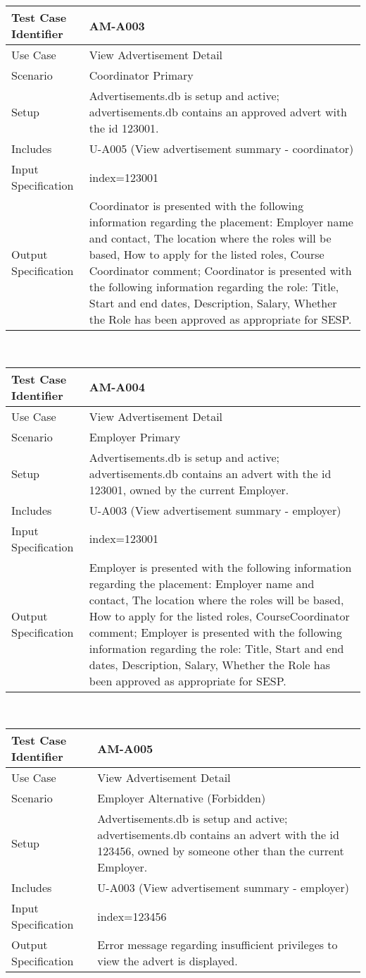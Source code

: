\documentclass{l3deliverable}
\begin{document}
\begin{tabular}{lp{10cm}}
\hline 
\textbf{Test Case Identifier} & AM-A003\tabularnewline
\hline 
\hline 
Use Case & View Advertisement Detail \tabularnewline
\hline 
Scenario & Coordinator Primary \tabularnewline
\hline 
Setup & Advertisements.db is setup and active; advertisements.db contains an approved advert with the id 123001.\tabularnewline
\hline 
Includes & U-A005 (View advertisement summary - coordinator) \tabularnewline
\hline 
Input Specification & index=123001 \tabularnewline
\hline 
Output Specification & Coordinator is presented with the following information regarding the placement: Employer name and contact, The location where the roles will be based, How to apply for the listed roles, Course Coordinator comment; Coordinator is presented with the following information regarding the role: Title, Start and end dates, Description, Salary, Whether the Role has been approved as appropriate for SESP.\tabularnewline
\hline 
\end{tabular}\\

\begin{tabular}{lp{10cm}}
\hline 
\textbf{Test Case Identifier} & AM-A004\tabularnewline
\hline 
\hline 
Use Case & View Advertisement Detail \tabularnewline
\hline 
Scenario & Employer Primary \tabularnewline
\hline 
Setup & Advertisements.db is setup and active; advertisements.db contains an advert with the id 123001, owned by the current Employer.\tabularnewline
\hline 
Includes & U-A003 (View advertisement summary - employer)\tabularnewline
\hline 
Input Specification & index=123001 \tabularnewline
\hline 
Output Specification & Employer is presented with the following information regarding the placement: Employer name and contact, The location where the roles will be based, How to apply for the listed roles, CourseCoordinator comment; Employer is presented with the following information regarding the role: Title, Start and end dates, Description, Salary, Whether the Role has been approved as appropriate for SESP.\tabularnewline
\hline 
\end{tabular}\\

\begin{tabular}{lp{10cm}}
\hline 
\textbf{Test Case Identifier} & AM-A005\tabularnewline
\hline 
\hline 
Use Case & View Advertisement Detail \tabularnewline
\hline 
Scenario & Employer Alternative (Forbidden) \tabularnewline
\hline 
Setup & Advertisements.db is setup and active; advertisements.db contains an advert with the id 123456, owned by someone other than the current Employer.\tabularnewline
\hline 
Includes & U-A003 (View advertisement summary - employer)\tabularnewline
\hline 
Input Specification & index=123456 \tabularnewline
\hline 
Output Specification & Error message regarding insufficient privileges to view the advert is displayed.\tabularnewline
\hline 
\end{tabular}\\
\end{document}
